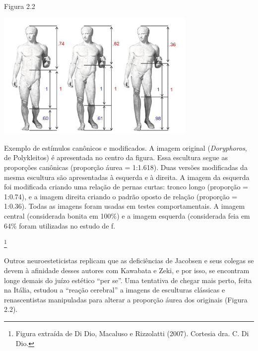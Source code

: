 \begin{center}
\footnotesize{Figura 2.2

\includegraphics[width=3.80329in,height=2.4338in]{imgs/2.png}

Exemplo de estímulos canônicos e modificados. A imagem
original (\emph{Doryphoros}, de Polykleitos) é apresentada no centro da
figura. Essa escultura segue as proporções canônicas (proporção áurea =
1:1.618). Duas versões modificadas da mesma escultura são apresentadas à
esquerda e à direita. A imagem da esquerda foi modificada criando uma
relação de pernas curtas: tronco longo (proporção = 1:0.74), e a imagem
direita criando o padrão oposto de relação (proporção = 1:0.36). Todas
as imagens foram usadas em testes comportamentais. A imagem central
(considerada bonita em 100\%) e a imagem esquerda (considerada feia em
64\% foram utilizadas no estudo de f.}\footnote[20]{Figura extraída de Di Dio,
Macaluso e Rizzolatti (2007). Cortesia dra. C. Di Dio.}
\end{center}

Outros neuroesteticistas replicam que as deficiências de Jacobsen e seus
colegas se devem à afinidade desses autores com Kawabata e Zeki, e por
isso, se encontram longe demais do juízo estético ``per se''. Uma
tentativa de chegar mais perto, feita na Itália, estudou a ``reação
cerebral'' a imagens de esculturas clássicas e renascentistas
manipuladas para alterar a proporção áurea dos originais (Figura 2.2).


